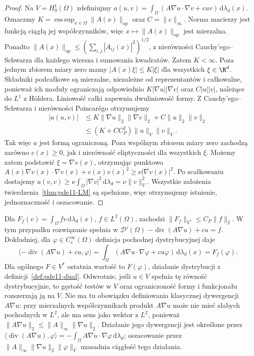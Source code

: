 \begin{proof}
Na $V=H_0^1(\Omega)$ zdefiniujmy
$a(u,v)=\int_\Omega(A\nabla u\cdot\nabla v+cuv)
\,\mathrm d\lambda_d(x)$.
Oznaczmy $K=\operatorname*{ess\,sup}_{x\in\Omega}
\|A(x)\|_{\mathrm{op}}$ oraz $C=\|c\|_\infty$.
Norma macierzy jest funkcją ciągłą jej współczynników,
więc $x\mapsto\|A(x)\|_{\mathrm{op}}$ jest mierzalna.
Ponadto $\|A(x)\|_{\mathrm{op}}\le
(\sum_{i,j}|A_{ij}(x)|^2)^{1/2}$, z nierówności
Cauchy'ego--Schwarza dla każdego wiersza i sumowania
kwadratów. Zatem $K<\infty$.
Poza jednym zbiorem miary zero mamy
$|A(x)\xi|\le K|\xi|$ dla wszystkich $\xi\in\R^d$.
Składniki podcałkowe są mierzalne, niezależne od
reprezentantów i całkowalne, ponieważ ich moduły
ograniczają odpowiednio $K|\nabla u||\nabla v|$
oraz $C|u||v|$, należące do $L^1$ z Höldera.
Liniowość całki zapewnia dwuliniowość formy.
Z Cauchy'ego--Schwarza i nierówności Poincar\'ego
otrzymujemy
\begin{align*}
|a(u,v)|
&\le K\|\nabla u\|_2\|\nabla v\|_2
+C\|u\|_2\|v\|_2\\
&\le(K+CC_P^2)\|u\|_V\|v\|_V.
\end{align*}
Tak więc $a$ jest formą ograniczoną.
Poza wspólnym zbiorem miary zero zachodzą zarówno
$c(x)\ge0$, jak i nierówność eliptyczności
dla wszystkich $\xi$. Możemy zatem podstawić
$\xi=\nabla v(x)$, otrzymując punktowo
$A(x)\nabla v(x)\cdot\nabla v(x)+c(x)v(x)^2
\ge\nu|\nabla v(x)|^2$.
Po scałkowaniu dostajemy
$a(v,v)\ge\nu\int_\Omega|\nabla v|^2
\,\mathrm d\lambda_d=\nu\|v\|_V^2$.
Wszystkie założenia twierdzenia~\ref{thm:pde11-LM} są spełnione,
więc otrzymujemy istnienie, jednoznaczność i oszacowanie.
\end{proof}

\begin{uwaga}
Dla $F_f(v)=\int_\Omega fv\,\mathrm d\lambda_d(x)$,
$f\in L^2(\Omega)$, zachodzi
$\|F_f\|_{V^*}\le C_P\|f\|_2$.
W tym przypadku rozwiązanie spełnia w $\mathcal D'(\Omega)$
$-\operatorname{div}(A\nabla u)+cu=f$.
Dokładniej, dla $\varphi\in C_c^\infty(\Omega)$
definicja pochodnej dystrybucyjnej daje
\[
 \langle-\operatorname{div}(A\nabla u)+cu,\varphi\rangle
 =\int_\Omega(A\nabla u\cdot\nabla\varphi+cu\varphi)
       \,\mathrm d\lambda_d(x)
 =F_f(\varphi).
\]
Dla ogólnego $F\in V^*$ ostatnia wartość to $F(\varphi)$,
działanie dystrybucji z definicji~\ref{def:pde11-dual}.
Odwrotnie, jeśli $u\in V$ spełnia tę równość
dystrybucyjnie, to gęstość testów w $V$ oraz
ograniczoność formy i funkcjonału rozszerzają ją na $V$.
Nie ma tu obowiązku definiowania klasycznej dywergencji
$A\nabla u$: przy mierzalnych współczynnikach produkt
$A\nabla u$ może nie mieć słabych pochodnych w $L^2$,
ale ma sens jako wektor z $L^2$, ponieważ
$\|A\nabla u\|_2\le\|A\|_\infty\|\nabla u\|_2$.
Działanie jego dywergencji jest określone przez
$\langle\operatorname{div}(A\nabla u),\varphi\rangle
=-\int_\Omega A\nabla u\cdot\nabla\varphi\,\mathrm d\lambda_d$;
oszacowanie przez $\|A\|_\infty\|\nabla u\|_2\|\varphi\|_V$
uzasadnia ciągłość tego działania.
\end{uwaga}

